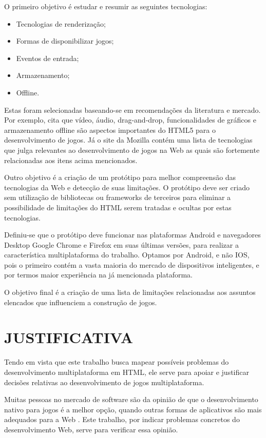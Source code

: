 O primeiro objetivo é estudar e resumir as seguintes tecnologias:
\begin{itemize}
\item Tecnologias de renderização;
\item Formas de disponibilizar jogos;
\item Eventos de entrada;
\item Armazenamento;
\item Offline.
\end{itemize}

Estas foram selecionadas baseando-se em recomendações da literatura
e mercado. Por exemplo, \citet{browserGamesTechnologyAndFuture} cita
que vídeo, áudio, drag-and-drop, funcionalidades de gráficos e
armazenamento offline são aspectos importantes do HTML5 para o
desenvolvimento de jogos. Já o site da Mozilla \citet{gamesIntroduction}
contém uma lista de tecnologias que julga relevantes ao desenvolvimento
de jogos na Web as quais são fortemente relacionadas aos itens acima
mencionados.

Outro objetivo é a criação de um protótipo para melhor compreensão
das tecnologias da Web e detecção de suas limitações. O protótipo
deve ser criado sem utilização de bibliotecas ou frameworks de
terceiros para eliminar a possibilidade de limitações  do HTML serem tratadas
e ocultas por estas tecnologias. 

Definiu-se que o protótipo deve funcionar nas plataformas Android e
navegadores Desktop Google Chrome e Firefox em suas últimas versões,
para realizar a característica multiplataforma do trabalho.  Optamos por
Android, e não IOS, pois o primeiro contém a vasta maioria do mercado
de dispositivos inteligentes, e por termos maior experiência na já
mencionada plataforma.

O objetivo final é a criação de uma lista de limitações relacionadas
aos assuntos elencados que influenciem a construção de jogos.

\section{JUSTIFICATIVA}

Tendo em vista que este trabalho busca mapear possíveis problemas
do desenvolvimento multiplataforma em HTML, ele serve para apoiar
e justificar decisões relativas ao desenvolvimento de jogos
multiplataforma.

Muitas pessoas no mercado de software são da opinião de que o
desenvolvimento nativo para jogos é a melhor opção, quando outras
formas de aplicativos são mais adequados para a Web \cite[p.
21]{aSeriousContender}. Este trabalho, por indicar problemas concretos
do desenvolvimento Web, serve para verificar essa opinião.


